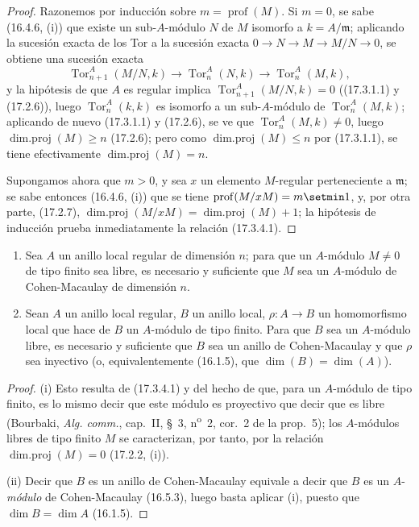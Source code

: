 \begin{proof}
Razonemos por inducción sobre $m=\operatorname{prof}(M)$. Si $m=0$, se sabe
(16.4.6, (i)) que existe un sub-$A$-módulo $N$ de $M$ isomorfo a
$k=A/\mathfrak{m}$; aplicando la sucesión exacta de los Tor a la sucesión
exacta $0\longrightarrow N\longrightarrow M\longrightarrow M/N\longrightarrow0$,
se obtiene una sucesión exacta
\[
  \operatorname{Tor}^A_{n+1}(M/N,k)\longrightarrow
  \operatorname{Tor}^A_n(N,k)\longrightarrow
  \operatorname{Tor}^A_n(M,k),
\]
y la hipótesis de que $A$ es regular implica
$\operatorname{Tor}^A_{n+1}(M/N,k)=0$ ((17.3.1.1) y (17.2.6)), luego
$\operatorname{Tor}^A_n(k,k)$ es isomorfo a un sub-$A$-módulo de
$\operatorname{Tor}^A_n(M,k)$; aplicando de nuevo (17.3.1.1) y (17.2.6), se
ve que $\operatorname{Tor}^A_n(M,k)\neq0$, luego
$\operatorname{dim.proj}(M)\geq n$ (17.2.6); pero como
$\operatorname{dim.proj}(M)\leq n$ por (17.3.1.1), se tiene efectivamente
$\operatorname{dim.proj}(M)=n$.

Supongamos ahora que $m>0$, y sea $x$ un elemento $M$-regular perteneciente a
$\mathfrak{m}$; se sabe entonces (16.4.6, (i)) que se tiene
$\operatorname{prof}(M/xM)=m\setmin 1$, y, por otra parte, (17.2.7),
$\operatorname{dim.proj}(M/xM)=\operatorname{dim.proj}(M)+1$; la hipótesis de
inducción prueba inmediatamente la relación (17.3.4.1).
\end{proof}


\begin{corollary}[17.3.5]
\label{0.17.3.5-es}
\begin{enumerate}
  \item[\rm(i)] Sea $A$ un anillo local regular de dimensión $n$; para que un
  $A$-módulo $M\neq0$ de tipo finito sea libre, es necesario y suficiente que
  $M$ sea un $A$-módulo de Cohen-Macaulay de dimensión $n$.
  \item[\rm(ii)] Sean $A$ un anillo local regular, $B$ un anillo local,
  $\rho:A\to B$ un homomorfismo local que hace de $B$ un $A$-módulo de tipo
  finito. Para que $B$ sea un $A$-módulo libre, es necesario y suficiente que
  $B$ sea un anillo de Cohen-Macaulay y que $\rho$ sea inyectivo \textup{(o,
  equivalentemente (16.1.5), que $\dim(B)=\dim(A)$)}.
\end{enumerate}
\end{corollary}

\begin{proof}
(i) Esto resulta de (17.3.4.1) y del hecho de que, para un $A$-módulo de tipo
finito, es lo mismo decir que este módulo es proyectivo que decir que es libre
(Bourbaki, \emph{Alg. comm.}, cap.~II, \S~3, n\textsuperscript{o}~2, cor.~2 de
la prop.~5); los $A$-módulos libres de tipo finito $M$ se caracterizan, por
tanto, por la relación $\operatorname{dim.proj}(M)=0$ (17.2.2, (i)).

(ii) Decir que $B$ es un anillo de Cohen-Macaulay equivale a decir que $B$ es
un $A$-\emph{módulo} de Cohen-Macaulay (16.5.3), luego basta aplicar (i), puesto que
$\dim B=\dim A$ (16.1.5).
\end{proof}

